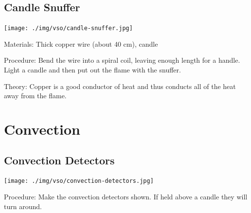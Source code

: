 \begin{multicols}{2}
\subsection{Candle Snuffer}

\begin{center}
\texttt{[image: ./img/vso/candle-snuffer.jpg]}
\end{center}

\begin{description*}
\item[Materials:]{Thick copper wire (about 40 cm), candle}
\item[Procedure:]{Bend the wire into a spiral coil, leaving enough length for a handle. Light a candle and then put out the flame with the snuffer.}
\item[Theory:]{Copper is a good conductor of heat and thus conducts all of the heat away from the flame.}
\end{description*}


\section*{Convection}


\subsection{Convection Detectors}

\begin{center}
\texttt{[image: ./img/vso/convection-detectors.jpg]}
\end{center}

\begin{description*}
\item[Procedure:]{Make the convection detectors shown. If held above a candle they will turn around.}
\end{description*}


\end{multicols}
